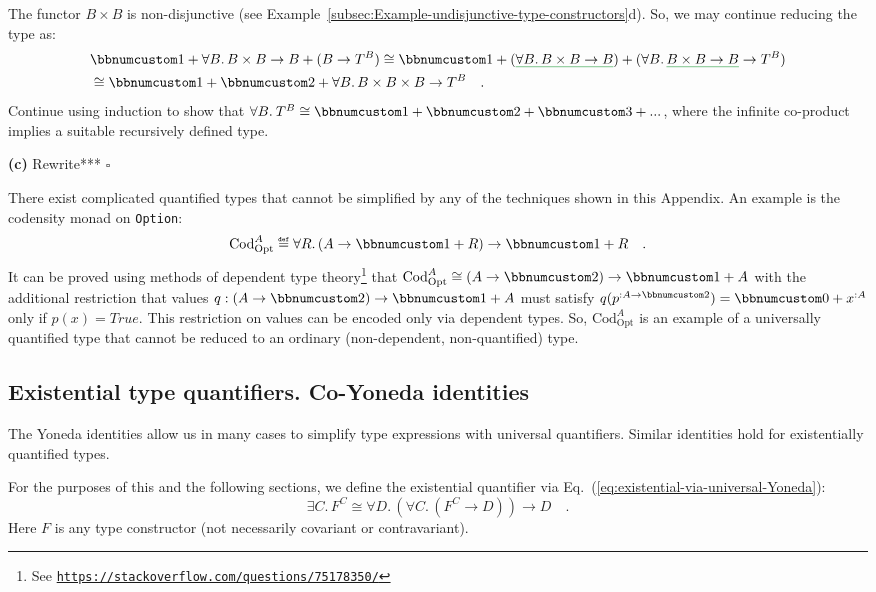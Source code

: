 The functor $B\times B$ is non-disjunctive (see Example~\ref{subsec:Example-undisjunctive-type-constructors}d).
So, we may continue reducing the type as:
\begin{align*}
 & \bbnum 1+\forall B.\,B\times B\rightarrow B+(B\rightarrow T^{B})\cong\bbnum 1+(\gunderline{\forall B.\,B\times B\rightarrow B})+(\forall B.\,\gunderline{B\times B\rightarrow B}\rightarrow T^{B})\\
 & \cong\bbnum 1+\bbnum 2+\forall B.\,B\times B\times B\rightarrow T^{B}\quad.
\end{align*}
Continue using induction to show that $\forall B.\:T^{B}\cong\bbnum 1+\bbnum 2+\bbnum 3+...$,
where the infinite co-product implies a suitable recursively defined
type.

\textbf{(c)} Rewrite{*}{*}{*} $\square$

There exist complicated quantified types that cannot be simplified
by any of the techniques shown in this Appendix. An example is the
codensity monad on \lstinline!Option!:
\[
\text{Cod}_{\text{Opt}}^{A}\triangleq\forall R.\,(A\rightarrow\bbnum 1+R)\rightarrow\bbnum 1+R\quad.
\]
It can be proved using methods of dependent type theory\footnote{See \texttt{\href{https://stackoverflow.com/questions/75178350/}{https://stackoverflow.com/questions/75178350/}}}
that $\text{Cod}_{\text{Opt}}^{A}\cong(A\rightarrow\bbnum 2)\rightarrow\bbnum 1+A$
with the additional restriction that values $q:(A\rightarrow\bbnum 2)\rightarrow\bbnum 1+A$
must satisfy $q(p^{:A\rightarrow\bbnum 2})=\bbnum 0+x^{:A}$ only
if $p(x)=True$. This restriction on values can be encoded only via
dependent types. So, $\text{Cod}_{\text{Opt}}^{A}$ is an example
of a universally quantified type that cannot be reduced to an ordinary
(non-dependent, non-quantified) type.

\subsection{Existential type quantifiers. Co-Yoneda identities}

The Yoneda identities allow us in many cases to simplify type expressions
with universal quantifiers. Similar identities hold for existentially
quantified types.

For the purposes of this and the following sections, we define the
existential quantifier via Eq.~(\ref{eq:existential-via-universal-Yoneda}):
\[
\exists C.\,F^{C}\cong\forall D.\,(\forall C.\,(F^{C}\rightarrow D))\rightarrow D\quad.
\]
Here $F$ is any type constructor (not necessarily covariant or contravariant).

